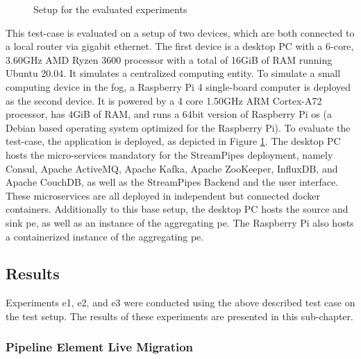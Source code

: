 \begin{figure}[!ht]
    \centering
    \graphicspath{{./figures/code/}}
    
    \caption{Setup for the evaluated experiments}
    \label{fEvaluationSetup}
\end{figure}


This test-case is evaluated on a setup of two devices, which are both connected to a local router via gigabit ethernet. The first device is a desktop PC with a 6-core, 3.60GHz AMD Ryzen 3600 processor with a total of 16GiB of RAM running Ubuntu 20.04. It simulates a centralized computing entity. To simulate a small computing device in the fog, a Raspberry Pi 4 single-board computer is deployed as the second device. It is powered by a 4 core 1.50GHz ARM Cortex-A72 processor, has 4GiB of RAM, and runs a 64bit version of Raspberry Pi \gls{os} (a Debian based operating system optimized for the Raspberry Pi). To evaluate the test-case, the application is deployed, as depicted in Figure \ref{fEvaluationSetup}. The desktop PC hosts the micro-services mandatory for the StreamPipes deployment, namely Consul, Apache ActiveMQ, Apache Kafka, Apache ZooKeeper, InfluxDB, and Apache CouchDB, as well as the StreamPipes Backend and the user interface. These microservices are all deployed in independent but connected docker containers. Additionally to this base setup, the desktop PC hosts the source and sink \gls{pe}, as well as an instance of the aggregating \gls{pe}. The Raspberry Pi also hosts a containerized instance of the aggregating \gls{pe}.

\subsection{Results}
\label{lEvaluationResults}

Experiments \acrshort{e}1, \acrshort{e}2, and \acrshort{e}3 were conducted using the above described test case on the test setup. The results of these experiments are presented in this sub-chapter.



\subsubsection{Pipeline Element Live Migration}
\label{lResultsOperatorStateMigration}

